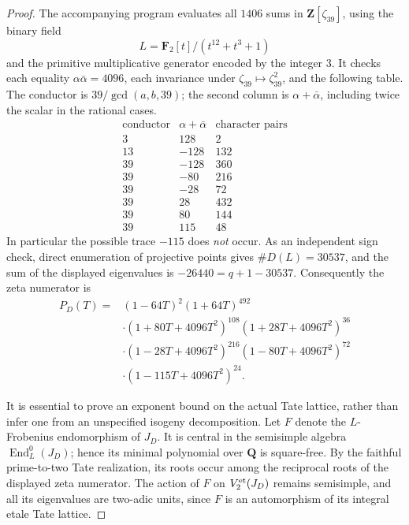 \begin{proof}
The accompanying program evaluates all \(1406\) sums in
\(\mathbf Z[\zeta_{39}]\), using the binary field
\[
              L=\mathbf F_2[t]/(t^{12}+t^3+1)
\]
and the primitive multiplicative generator encoded by the
integer \(3\). It checks each equality
\(\alpha\bar\alpha=4096\), each invariance under
\(\zeta_{39}\mapsto\zeta_{39}^2\), and the following table.
The conductor is \(39/\gcd(a,b,39)\); the second column
is \(\alpha+\bar\alpha\), including twice the scalar in
the rational cases.
\[
\begin{array}{r|r|r}
 \text{conductor}&\alpha+\bar\alpha&\text{character pairs}\\ \hline
 3&128&2\\
 13&-128&132\\
 39&-128&360\\
 39&-80&216\\
 39&-28&72\\
 39&28&432\\
 39&80&144\\
 39&115&48
\end{array}
\]
In particular the possible trace \(-115\) does \emph{not}
occur. As an independent sign check, direct enumeration
of projective points gives \(\#D(L)=30537\), and the
sum of the displayed eigenvalues is \(-26440=q+1-30537\).
Consequently the zeta numerator is
\[
\begin{aligned}
 P_D(T)={}&(1-64T)^2(1+64T)^{492}\\
 &\cdot(1+80T+4096T^2)^{108}
        (1+28T+4096T^2)^{36}\\
 &\cdot(1-28T+4096T^2)^{216}
        (1-80T+4096T^2)^{72}\\
 &\cdot(1-115T+4096T^2)^{24}.
\end{aligned}
\]

It is essential to prove an exponent bound on the actual
Tate lattice, rather than infer one from an unspecified
isogeny decomposition. Let \(F\) denote the \(L\)-Frobenius
endomorphism of \(J_D\). It is central in the semisimple
algebra \(\operatorname{End}_L^0(J_D)\); hence its minimal
polynomial over \(\mathbf Q\) is square-free. By the
faithful prime-to-two Tate realization, its roots occur
among the reciprocal roots of the displayed zeta numerator. The action
of \(F\) on \(V_2^{\rm et}(J_D)\) remains semisimple,
and all its eigenvalues are two-adic units, since \(F\)
is an automorphism of its integral etale Tate lattice.


\end{proof}
